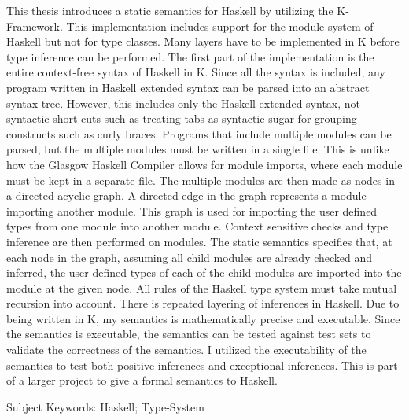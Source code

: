 This thesis introduces a static semantics for Haskell by utilizing the K-Framework. This implementation includes support for the module system of Haskell but not for type classes. Many layers have to be implemented in K before type inference can be performed. The first part of the implementation is the entire context-free syntax of Haskell in K. Since all the syntax is included, any program written in Haskell extended syntax can be parsed into an abstract syntax tree. However, this includes only the Haskell extended syntax, not syntactic short-cuts such as treating tabs as syntactic sugar for grouping constructs such as curly braces. Programs that include multiple modules can be parsed, but the multiple modules must be written in a single file. This is unlike how the Glasgow Haskell Compiler allows for module imports, where each module must be kept in a separate file. The multiple modules are then made as nodes in a directed acyclic graph. A directed edge in the graph represents a module importing another module. This graph is used for importing the user defined types from one module into another module. Context sensitive checks and type inference are then performed on modules. The static semantics specifies that, at each node in the graph, assuming all child modules are already checked and inferred, the user defined types of each of the child modules are imported into the module at the given node. All rules of the Haskell type system must take mutual recursion into account. There is repeated layering of inferences in Haskell. Due to being written in K, my semantics is mathematically precise and executable. Since the semantics is executable, the semantics can be tested against test sets to validate the correctness of the semantics. I utilized the executability of the semantics to test both positive inferences and exceptional inferences. This is part of a larger project to give a formal semantics to Haskell.

Subject Keywords: Haskell; Type-System
